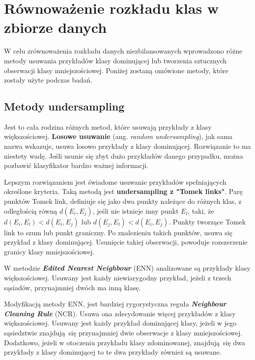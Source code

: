 \section{Równoważenie rozkładu klas w zbiorze danych}
W celu zrównoważenia rozkładu danych niezbilansowanych wprowadzono różne metody usuwania przykładów klasy dominującej lub tworzenia sztucznych obserwacji klasy mniejszościowej. Poniżej zostaną omówione metody, które zostały użyte podczas badań.
\subsection{Metody undersampling}
Jest to cała rodzina różnych metod, które usuwają przykłady z klasy większościowej. \textbf{Losowe usuwanie} (ang. \textit{random undersampling}), jak sama nazwa wskazuje, usuwa losowo przykłady z klasy dominującej. Rozwiązanie to ma niestety wadę. Jeśli usunie się zbyt dużo przykładów danego przypadku, można pozbawić klasyfikator bardzo ważnej informacji. \par
Lepszym rozwiązaniem jest świadome usuwanie przykładów spełniających określone kryteria. Taką metodą jest \textbf{undersampling z "Tomek links"}. Parę punktów Tomek link, definiuje się jako dwa punkty należące do różnych klas, z odległością równą $d(E_i,E_j)$, jeśli nie istnieje inny punkt $E_l$, taki, że $d(E_i,E_l) < d(E_i,E_j)$ lub $d(E_j,E_l) < d(E_i,E_j)$. Punkty tworzące Tomek link to szum lub punkt graniczny. Po znalezieniu takich punktów, usuwa się przykład z klasy dominującej. Usunięcie takiej obserwacji, powoduje rozszerzenie granicy klasy mniejszościowej. \par
W metodzie \textbf{\textit{Edited Nearest Neighbour}} (ENN) analizowane są przykłady klasy większościowej. Usuwany jest każdy niewiarygodny przykład, jeżeli z trzech sąsiadów, przynajmniej dwóch ma inną klasę. \par
Modyfikacją metody ENN, jest bardziej rygorystyczna reguła \textbf{\textit{Neighbour Cleaning Rule}} (NCR). Usuwa ona zdecydowanie więcej przykładów z klasy większościowej. Usuwany jest każdy przykład dominującej klasy, jeżeli w jego sąsiedztwie znajdują się przynajmniej dwie obserwacje z klasy mniejszościowej. Dodatkowo, jeżeli w otoczeniu przykładu klasy zdominowanej, znajdują się dwa przykłady z klasy dominującej to te dwa przykłady również są usuwane.

